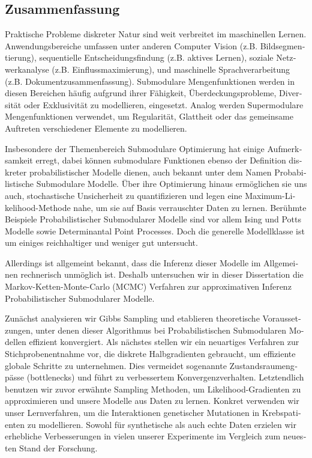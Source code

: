 \cleardoublepage
\begin{otherlanguage}{german}
\section*{\centering Zusammenfassung}
\vspace{1em}
Praktische Probleme diskreter Natur sind weit verbreitet im maschinellen Lernen.
Anwendungsbereiche umfassen unter anderen Computer Vision (z.B. Bildsegmentierung), sequentielle Entscheidungsfindung (z.B. aktives Lernen), soziale Netzwerkanalyse (z.B. Einflussmaximierung), und maschinelle Sprachverarbeitung (z.B. Dokumentzusammenfassung).
Submodulare Mengenfunktionen werden in diesen Bereichen häufig aufgrund ihrer Fähigkeit, Überdeckungsprobleme, Diversität oder Exklusivität zu modellieren, eingesetzt.
Analog werden Supermodulare Mengenfunktionen verwendet, um Regularität, Glattheit oder das gemeinsame Auftreten verschiedener Elemente zu modellieren.

Insbesondere der Themenbereich Submodulare Optimierung hat einige Aufmerksamkeit erregt, dabei können submodulare Funktionen ebenso der Definition diskreter probabilistischer Modelle dienen, auch bekannt unter dem Namen Probabilistische Submodulare Modelle.
Über ihre Optimierung hinaus ermöglichen sie uns auch, stochastische Unsicherheit zu quantifizieren und legen eine Maximum-Likelihood-Methode nahe, um sie auf Basis verrauschter Daten zu lernen.
Berühmte Beispiele Probabilistischer Submodularer Modelle sind vor allem Ising und Potts Modelle sowie Determinantal Point Processes.
Doch die generelle Modellklasse ist um einiges reichhaltiger und weniger gut untersucht. 

Allerdings ist allgemeint bekannt, dass die Inferenz dieser Modelle im Allgemeinen rechnerisch unmöglich ist.
Deshalb untersuchen wir in dieser Dissertation die Markov-Ketten-Monte-Carlo (MCMC) Verfahren zur approximativen Inferenz Probabilistischer Submodularer Modelle.

Zunächst analysieren wir Gibbs Sampling und etablieren theoretische Voraussetzungen, unter denen dieser Algorithmus bei Probabilistischen Submodularen Modellen effizient konvergiert.
Als nächstes stellen wir ein neuartiges Verfahren zur Stichprobenentnahme vor, die diskrete Halbgradienten gebraucht, um effiziente globale Schritte zu unternehmen.
Dies vermeidet sogenannte Zustandsraumengpässe (bottlenecks) und führt zu verbessertem Konvergenzverhalten.
Letztendlich benutzen wir zuvor erwähnte Sampling Methoden, um Likelihood-Gradienten zu approximieren und unsere Modelle aus Daten zu lernen.
Konkret verwenden wir unser Lernverfahren, um die Interaktionen genetischer Mutationen in Krebspatienten zu modellieren.
Sowohl für synthetische als auch echte Daten erzielen wir erhebliche Verbesserungen in vielen unserer Experimente im Vergleich zum neuesten Stand der Forschung.
\end{otherlanguage}

